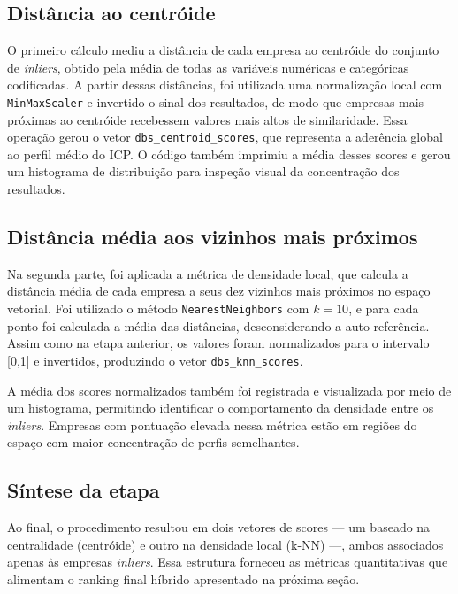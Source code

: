 \subsection{Distância ao centróide}

O primeiro cálculo mediu a distância de cada empresa ao centróide do conjunto de \textit{inliers}, obtido pela média de todas as variáveis numéricas e categóricas codificadas. A partir dessas distâncias, foi utilizada uma normalização local com \texttt{MinMaxScaler} e invertido o sinal dos resultados, de modo que empresas mais próximas ao centróide recebessem valores mais altos de similaridade. Essa operação gerou o vetor \texttt{dbs\_centroid\_scores}, que representa a aderência global ao perfil médio do ICP. O código também imprimiu a média desses scores e gerou um histograma de distribuição para inspeção visual da concentração dos resultados.

\subsection{Distância média aos vizinhos mais próximos}

Na segunda parte, foi aplicada a métrica de densidade local, que calcula a distância média de cada empresa a seus dez vizinhos mais próximos no espaço vetorial. Foi utilizado o método \texttt{NearestNeighbors} com $k=10$, e para cada ponto foi calculada a média das distâncias, desconsiderando a auto-referência. Assim como na etapa anterior, os valores foram normalizados para o intervalo [0,1] e invertidos, produzindo o vetor \texttt{dbs\_knn\_scores}. 

A média dos scores normalizados também foi registrada e visualizada por meio de um histograma, permitindo identificar o comportamento da densidade entre os \textit{inliers}. Empresas com pontuação elevada nessa métrica estão em regiões do espaço com maior concentração de perfis semelhantes.

\subsection{Síntese da etapa}

Ao final, o procedimento resultou em dois vetores de scores — um baseado na centralidade (centróide) e outro na densidade local (k-NN) —, ambos associados apenas às empresas \textit{inliers}. Essa estrutura forneceu as métricas quantitativas que alimentam o ranking final híbrido apresentado na próxima seção.

